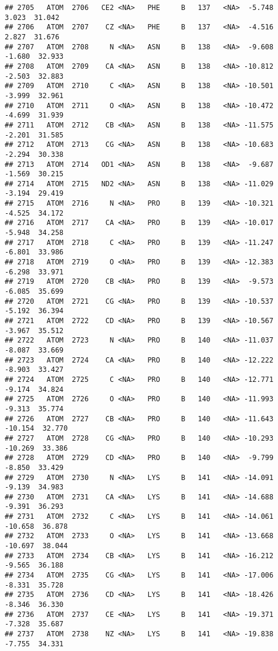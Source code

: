 \documentclass[
]{article}
\begin{document}
\begin{verbatim}
## 2705   ATOM  2706   CE2 <NA>   PHE     B   137   <NA>  -5.748   3.023  31.042
## 2706   ATOM  2707    CZ <NA>   PHE     B   137   <NA>  -4.516   2.827  31.676
## 2707   ATOM  2708     N <NA>   ASN     B   138   <NA>  -9.608  -1.680  32.933
## 2708   ATOM  2709    CA <NA>   ASN     B   138   <NA> -10.812  -2.503  32.883
## 2709   ATOM  2710     C <NA>   ASN     B   138   <NA> -10.501  -3.999  32.961
## 2710   ATOM  2711     O <NA>   ASN     B   138   <NA> -10.472  -4.699  31.939
## 2711   ATOM  2712    CB <NA>   ASN     B   138   <NA> -11.575  -2.201  31.585
## 2712   ATOM  2713    CG <NA>   ASN     B   138   <NA> -10.683  -2.294  30.338
## 2713   ATOM  2714   OD1 <NA>   ASN     B   138   <NA>  -9.687  -1.569  30.215
## 2714   ATOM  2715   ND2 <NA>   ASN     B   138   <NA> -11.029  -3.194  29.419
## 2715   ATOM  2716     N <NA>   PRO     B   139   <NA> -10.321  -4.525  34.172
## 2716   ATOM  2717    CA <NA>   PRO     B   139   <NA> -10.017  -5.948  34.258
## 2717   ATOM  2718     C <NA>   PRO     B   139   <NA> -11.247  -6.801  33.986
## 2718   ATOM  2719     O <NA>   PRO     B   139   <NA> -12.383  -6.298  33.971
## 2719   ATOM  2720    CB <NA>   PRO     B   139   <NA>  -9.573  -6.085  35.699
## 2720   ATOM  2721    CG <NA>   PRO     B   139   <NA> -10.537  -5.192  36.394
## 2721   ATOM  2722    CD <NA>   PRO     B   139   <NA> -10.567  -3.967  35.512
## 2722   ATOM  2723     N <NA>   PRO     B   140   <NA> -11.037  -8.087  33.669
## 2723   ATOM  2724    CA <NA>   PRO     B   140   <NA> -12.222  -8.903  33.427
## 2724   ATOM  2725     C <NA>   PRO     B   140   <NA> -12.771  -9.174  34.824
## 2725   ATOM  2726     O <NA>   PRO     B   140   <NA> -11.993  -9.313  35.774
## 2726   ATOM  2727    CB <NA>   PRO     B   140   <NA> -11.643 -10.154  32.770
## 2727   ATOM  2728    CG <NA>   PRO     B   140   <NA> -10.293 -10.269  33.386
## 2728   ATOM  2729    CD <NA>   PRO     B   140   <NA>  -9.799  -8.850  33.429
## 2729   ATOM  2730     N <NA>   LYS     B   141   <NA> -14.091  -9.139  34.983
## 2730   ATOM  2731    CA <NA>   LYS     B   141   <NA> -14.688  -9.391  36.293
## 2731   ATOM  2732     C <NA>   LYS     B   141   <NA> -14.061 -10.658  36.878
## 2732   ATOM  2733     O <NA>   LYS     B   141   <NA> -13.668 -10.697  38.044
## 2733   ATOM  2734    CB <NA>   LYS     B   141   <NA> -16.212  -9.565  36.188
## 2734   ATOM  2735    CG <NA>   LYS     B   141   <NA> -17.006  -8.331  35.728
## 2735   ATOM  2736    CD <NA>   LYS     B   141   <NA> -18.426  -8.346  36.330
## 2736   ATOM  2737    CE <NA>   LYS     B   141   <NA> -19.371  -7.328  35.687
## 2737   ATOM  2738    NZ <NA>   LYS     B   141   <NA> -19.838  -7.755  34.331

\end{verbatim}
\end{document}
